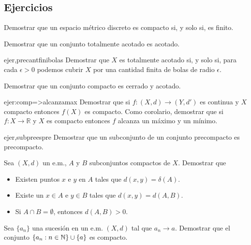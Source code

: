  \subsection{Ejercicios}
 
 

\begin{ejercicio}{} Demostrar que un espacio métrico discreto es compacto
si, y solo si, es finito.
\end{ejercicio}

\begin{ejercicio}{} Demostrar que un conjunto totalmente acotado es
acotado.
\end{ejercicio}



\begin{ejercicio}{ejer,precantfinibolas} Demostrar que $X$ es totalmente acotado si, y
solo si, para cada $\epsilon>0$ podemos cubrir $X$ por una cantidad
finita de bolas de radio $\epsilon$.
\end{ejercicio}

\begin{ejercicio}{} Demostrar que un conjunto compacto es cerrado y
acotado.
\end{ejercicio}

\begin{ejercicio}{ejer:comp=>alcanzamax} Demostrar que si $f:(X,d)\to (Y,d')$ es continua
y $X$ compacto entonces $f(X)$ es compacto. Como corolario,
demostrar que si $f:X\to\mathbb{R}$ y $X$ es compacto entonces $f$
alcanza un máximo y un mínimo.
\end{ejercicio}

\begin{ejercicio}{ejer,subpreespre} Demostrar que un
subconjunto de un conjunto precompacto es precompacto.
\end{ejercicio}

\begin{ejercicio}{} Sea $(X,d)$ un e.m., $A$ y $B$ subconjuntos compactos de
$X$. Demostrar que
\begin{itemize}
    \item[i)] Existen puntos $x$ e $y$ en $A$ tales que $d(x,y)=\delta(A)$.
    \item[ii)] Existe un $x\in A$ e $y\in B$ tales que
    $d(x,y)=d(A,B)$.
    \item[iii)] Si $A\cap B=\emptyset$, entonces $d(A,B)>0$.
\end{itemize}
\end{ejercicio}
\begin{ejercicio}{} Sea $\{a_n\}$ una sucesi\'on en un e.m. $(X,d)$
tal que $a_n\to a$. Demostrar que el conjunto
$\{a_n:n\in\mathbb{N}\}\cup\{a\}$ es compacto.
\end{ejercicio}

